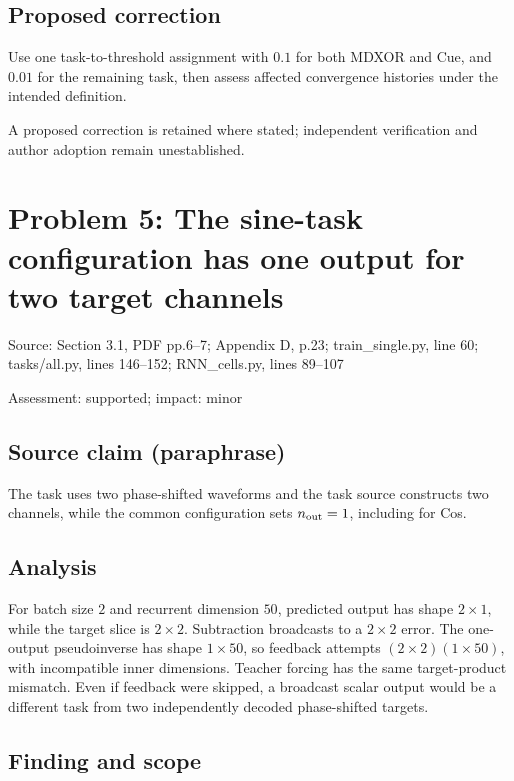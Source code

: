 \documentclass[11pt]{article}
\begin{document}
\subsection*{Proposed correction}

Use one task-to-threshold assignment with \(0.1\) for both MDXOR and Cue, and \(0.01\) for the remaining task, then assess affected convergence histories under the intended definition.

A proposed correction is retained where stated; independent verification and author adoption remain unestablished.

\section*{Problem 5: The sine-task configuration has one output for two target channels}

Source: Section 3.1, PDF pp.6–7; Appendix D, p.23; train\_single.py, line 60; tasks/all.py, lines 146–152; RNN\_cells.py, lines 89–107

Assessment: supported; impact: minor

\subsection*{Source claim (paraphrase)}

The task uses two phase-shifted waveforms and the task source constructs two channels, while the common configuration sets \(n_{\rm out}=1\), including for Cos.

\subsection*{Analysis}

For batch size \(2\) and recurrent dimension \(50\), predicted output has shape \(2\times1\), while the target slice is \(2\times2\). Subtraction broadcasts to a \(2\times2\) error. The one-output pseudoinverse has shape \(1\times50\), so feedback attempts \((2\times2)(1\times50)\), with incompatible inner dimensions. Teacher forcing has the same target-product mismatch. Even if feedback were skipped, a broadcast scalar output would be a different task from two independently decoded phase-shifted targets.

\subsection*{Finding and scope}
\end{document}
